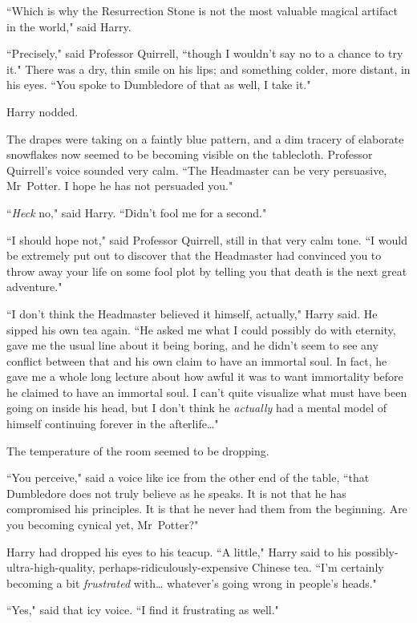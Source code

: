 ``Which is why the Resurrection Stone is not the most valuable magical artifact in the world," said Harry.

``Precisely," said Professor Quirrell, ``though I wouldn't say no to a chance to try it." There was a dry, thin smile on his lips; and something colder, more distant, in his eyes. ``You spoke to Dumbledore of that as well, I take it."

Harry nodded.

The drapes were taking on a faintly blue pattern, and a dim tracery of elaborate snowflakes now seemed to be becoming visible on the tablecloth. Professor Quirrell's voice sounded very calm. ``The Headmaster can be very persuasive, Mr~Potter. I hope he has not persuaded you."

``\emph{Heck} no," said Harry. ``Didn't fool me for a second."

``I should hope not," said Professor Quirrell, still in that very calm tone. ``I would be extremely put out to discover that the Headmaster had convinced you to throw away your life on some fool plot by telling you that death is the next great adventure."

``I don't think the Headmaster believed it himself, actually," Harry said. He sipped his own tea again. ``He asked me what I could possibly do with eternity, gave me the usual line about it being boring, and he didn't seem to see any conflict between that and his own claim to have an immortal soul. In fact, he gave me a whole long lecture about how awful it was to want immortality before he claimed to have an immortal soul. I can't quite visualize what must have been going on inside his head, but I don't think he \emph{actually} had a mental model of himself continuing forever in the afterlife{\ldots}"

The temperature of the room seemed to be dropping.

``You perceive," said a voice like ice from the other end of the table, ``that Dumbledore does not truly believe as he speaks. It is not that he has compromised his principles. It is that he never had them from the beginning. Are you becoming cynical yet, Mr~Potter?"

Harry had dropped his eyes to his teacup. ``A little," Harry said to his possibly-ultra-high-quality, perhaps-ridiculously-expensive Chinese tea. ``I'm certainly becoming a bit \emph{frustrated} with{\ldots} whatever's going wrong in people's heads."

``Yes," said that icy voice. ``I find it frustrating as well."

